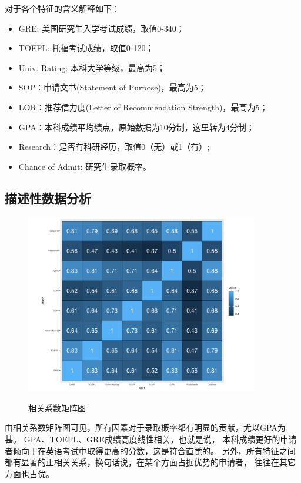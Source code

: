 \documentclass[12pt, UTF8, a4paper]{ctexart}
\begin{document}
对于各个特征的含义解释如下：

\begin{itemize}
    \item GRE: 美国研究生入学考试成绩，取值0-340；
    \item TOEFL: 托福考试成绩，取值0-120；
    \item Univ. Rating: 本科大学等级，最高为5；
    \item SOP：申请文书(Statement of Purpose)，最高为5；
    \item LOR：推荐信力度(Letter of Recommendation Strength)，最高为5；
    \item GPA：本科成绩平均绩点，原始数据为10分制，这里转为4分制；
    \item Research：是否有科研经历，取值0（无）或1（有）;
    \item Chance of Admit: 研究生录取概率。
\end{itemize}

\subsection{描述性数据分析}

\begin{figure}[htb]
    \centering
    \includegraphics[width=4in, keepaspectratio]{./pic/corplot.pdf}\\
    \caption{相关系数矩阵图}
\end{figure}

由相关系数矩阵图可见，所有因素对于录取概率都有明显的贡献，尤以GPA为甚。
GPA、TOEFL、GRE成绩高度线性相关，也就是说，
本科成绩更好的申请者倾向于在英语考试中取得更高的分数，这是符合直觉的。
另外，所有特征之间都有显著的正相关关系，换句话说，在某个方面占据优势的申请者，
往往在其它方面也占优。
\end{document}
